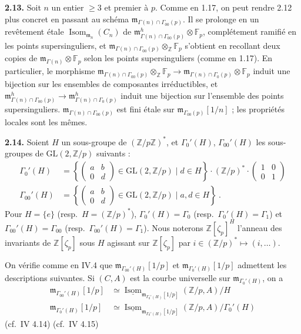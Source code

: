\documentclass[10pt,a4paper]{amsart}
\theoremstyle{plain}
\theoremstyle{definition}
\DeclareMathOperator{\Isom}{Isom}
\newcommand{\m}{\mathfrak{m}}
\newcommand{\FF}{\mathbb{F}}
\newcommand{\ZZ}{\mathbb{Z}}
\newcommand{\GL}{\mathrm{GL}}
\begin{document}
\medskip\noindent\textbf{2.13.} Soit $n$ un entier $\geq 3$ et premier \`a $p$. Comme en 1.17, on peut rendre 2.12 plus concret en passant au sch\'ema $\m_{\Gamma(n) \cap \Gamma_{00}(p)}$. Il se prolonge en un rev\^etement \'etale $\Isom_{\m_n}(C_n)$ de $\m_{\Gamma(n) \cap \Gamma_{00}(p)}^h \otimes \FF_p$, compl\'etement ramifi\'e en les points supersinguliers, et $\m_{\Gamma(n) \cap \Gamma_{00}(p)} \otimes_\ZZ \FF_p$ s'obtient en recollant deux copies de $\m_{\Gamma(n)} \otimes \FF_p$ selon les points supersinguliers (comme en 1.17). En particulier, le morphisme $\m_{\Gamma(n) \cap \Gamma_{00}(p)} \otimes_\ZZ \FF_p \to \m_{\Gamma(n) \cap \Gamma_0(p)} \otimes \FF_p$ induit une bijection sur les ensembles de composantes irr\'eductibles, et $\m_{\Gamma(n) \cap \Gamma_{00}(p)}^h \to \m_{\Gamma(n) \cap \Gamma_0(p)}^h$ induit une bijection sur l'ensemble des points supersinguliers. $\m_{\Gamma(n) \cap \Gamma_{00}(p)}$ est fini \'etale sur $\m_{\Gamma_{00}(p)}[1/n]$ ; les propri\'et\'es locales sont les m\^emes.

\medskip\noindent\textbf{2.14.} Soient $H$ un sous-groupe de $(\ZZ/p\ZZ)^*$, et $\Gamma_0'(H)$, $\Gamma_{00}'(H)$ les sous-groupes de $\GL(2,\ZZ/p)$ suivants :
\begin{align*}
\Gamma_0'(H) &= \left\{\begin{pmatrix} a & b \\ 0 & d \end{pmatrix} \in \GL(2,\ZZ/p) \mid d \in H\right\}\cdot (\ZZ/p)^*\cdot \begin{pmatrix} 1 & 0 \\ 0 & 1 \end{pmatrix}\\
\Gamma_{00}'(H) &= \left\{\begin{pmatrix} a & b \\ 0 & d \end{pmatrix} \in \GL(2,\ZZ/p) \mid a, d \in H\right\}\ .
\end{align*}
Pour $H = \{e\}$ (resp.\ $H = (\ZZ/p)^*$), $\Gamma_0'(H) = \Gamma_0$ (resp.\ $\Gamma_0'(H) = \Gamma_1$) et $\Gamma_{00}'(H) = \Gamma_{00}$ (resp.\ $\Gamma_{00}'(H) = \Gamma_1$). Nous noterons $\ZZ[\zeta_p]^H$ l'anneau des invariants de $\ZZ[\zeta_p]$ sous $H$ agissant sur $\ZZ[\zeta_p]$ par $i \in (\ZZ/p)^* \mapsto (i, \ldots)$.

On v\'erifie comme en IV.4 que $\m_{\Gamma_{00}'(H)}[1/p]$ et $\m_{\Gamma_0'(H)}[1/p]$ admettent les descriptions suivantes. Si $(C,A)$ est la courbe universelle sur $\m_{\Gamma_0'(H)}$, on a
\begin{align}
\m_{\Gamma_{00}'(H)}[1/p] &\simeq \underline{\Isom}_{\m_{\Gamma_0'(H)}[1/p]}(\ZZ/p, A)/H\\
\m_{\Gamma_0'(H)}[1/p] &\simeq \underline{\Isom}_{\m_{\Gamma_0'(H)}[1/p]}(\ZZ/p, A)/\Gamma_0'(H)
\end{align}
(cf.\ IV 4.14) (cf.\ IV 4.15)
\end{document}
